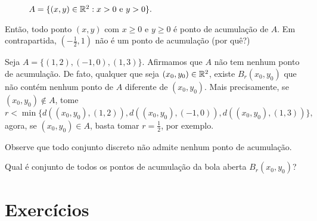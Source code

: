 \begin{example}
\begin{figure}[htbp]
                \caption{\(A = \{(x,y)\in\mathbb{R}^2 : x > 0 \text{ e } y>0\}.\)}
                \label{fig:bolaaberta2}
            \end{figure}
    
    Então, todo ponto \((x,y)\) com \(x\geq 0\) e \(y\geq 0\) é ponto de acumulação de \(A\). Em contrapartida, \(\left( -\frac{1}{2},1 \right)\) não é um ponto de acumulação (por quê?)
\end{example}

\begin{example}
    Seja \(A = \{(1,2), (-1,0), (1,3)\}\). Afirmamos que \(A\) não tem nenhum ponto de acumulação. De fato, qualquer que seja \((x_0,y_0)\in\mathbb{R}^2\), existe \(B_r(x_0,y_0)\) que não contém nenhum ponto de \(A\) diferente de \((x_0,y_0)\). Mais precisamente, se \((x_0,y_0)\notin A\), tome \[r < \min\{d((x_0,y_0),(1,2)), d((x_0,y_0),(-1,0)),d((x_0,y_0),(1,3))\},\] agora, se \((x_0,y_0)\in A\), basta tomar \(r = \frac{1}{2}\), por exemplo.

    \begin{remark}
        Observe que todo conjunto discreto não admite nenhum ponto de acumulação.
    \end{remark}
\end{example}

\begin{exercise}
    Qual é conjunto de todos os pontos de acumulação da bola aberta \(B_r(x_0,y_0)\)?
\end{exercise}

\section{Exercícios}

